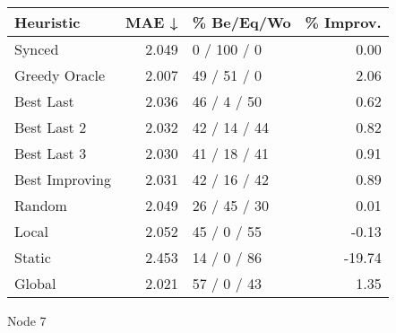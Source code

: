 \begin{tabular}{lrlr}
\toprule
\textbf{Heuristic} & \textbf{MAE ↓} & \textbf{\% Be/Eq/Wo} & \textbf{\% Improv.} \\
\midrule
            Synced &          2.049 &          0 / 100 / 0 &                0.00 \\
     Greedy Oracle &          2.007 &          49 / 51 / 0 &                2.06 \\
         Best Last &          2.036 &          46 / 4 / 50 &                0.62 \\
       Best Last 2 &          2.032 &         42 / 14 / 44 &                0.82 \\
       Best Last 3 &          2.030 &         41 / 18 / 41 &                0.91 \\
    Best Improving &          2.031 &         42 / 16 / 42 &                0.89 \\
            Random &          2.049 &         26 / 45 / 30 &                0.01 \\
             Local &          2.052 &          45 / 0 / 55 &               -0.13 \\
            Static &          2.453 &          14 / 0 / 86 &              -19.74 \\
            Global &          2.021 &          57 / 0 / 43 &                1.35 \\
\bottomrule
\end{tabular}
\caption{Node 7}
\label{tab:hr_non_lr01_le1_bs4_7}

